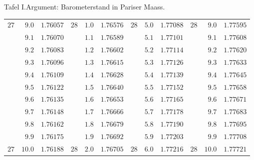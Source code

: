 \begin{GaussVIRefractionPlate}{Tafel I.\quad Argument: Barometerstand in Pariser Maass.}
{\begin{tabular}{rr|r||rr|r||rr|r||rr|r}
$27$ & $9.0$ & $1.76057$ & $28$ & $1.0$ & $1.76576$ & $28$ & $5.0$ & $1.77088$ & $28$ & $9.0$ & $1.77595$\\
 & $9.1$ & $1.76070$ &  & $1.1$ & $1.76589$ &  & $5.1$ & $1.77101$ &  & $9.1$ & $1.77608$\\
 & $9.2$ & $1.76083$ &  & $1.2$ & $1.76602$ &  & $5.2$ & $1.77114$ &  & $9.2$ & $1.77620$\\
 & $9.3$ & $1.76096$ &  & $1.3$ & $1.76615$ &  & $5.3$ & $1.77126$ &  & $9.3$ & $1.77633$\\
 & $9.4$ & $1.76109$ &  & $1.4$ & $1.76628$ &  & $5.4$ & $1.77139$ &  & $9.4$ & $1.77645$\\
 & $9.5$ & $1.76122$ &  & $1.5$ & $1.76640$ &  & $5.5$ & $1.77152$ &  & $9.5$ & $1.77658$\\
 & $9.6$ & $1.76135$ &  & $1.6$ & $1.76653$ &  & $5.6$ & $1.77165$ &  & $9.6$ & $1.77671$\\
 & $9.7$ & $1.76148$ &  & $1.7$ & $1.76666$ &  & $5.7$ & $1.77178$ &  & $9.7$ & $1.77683$\\
 & $9.8$ & $1.76162$ &  & $1.8$ & $1.76679$ &  & $5.8$ & $1.77190$ &  & $9.8$ & $1.77695$\\
 & $9.9$ & $1.76175$ &  & $1.9$ & $1.76692$ &  & $5.9$ & $1.77203$ &  & $9.9$ & $1.77708$\\[4pt]
$27$ & $10.0$ & $1.76188$ & $28$ & $2.0$ & $1.76705$ & $28$ & $6.0$ & $1.77216$ & $28$ & $10.0$ & $1.77721$
\end{tabular}}
\end{GaussVIRefractionPlate}
\smallskip\noindent\makebox[.84\linewidth][r]{{\normalsize\bfseries 24\textsuperscript{*}}}\par
\clearpage
\thispagestyle{empty}
\noindent{}%
%
\makebox[\dimexpr\linewidth-24mm\relax]{}%
\makebox[12mm][r]{}\par\nobreak\smallskip
